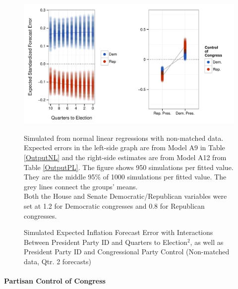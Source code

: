 \documentclass[a4paper]{article}\usepackage{graphicx, color}
\newenvironment{knitrout}{}{} %
\begin{document}
\begin{figure}[t]
    \caption{Simulated Expected Inflation Forecast Error with Interactions Between President Party ID and Quarters to Election$^{2}$, as well as President Party ID and Congressional Party Control (Non-matched data, Qtr. 2 forecasts)}
    \label{InterPlot}
    \begin{center}

\begin{knitrout}
\color{fgcolor}

{\centering \includegraphics[width=0.95\linewidth]{figure/InterPlot} 

}



\end{knitrout}


    \end{center}
    \begin{singlespace}
        {\scriptsize{Simulated from normal linear regressions with non-matched data. Expected errors in the left-side graph are from Model A9 in Table \ref{OutputNL} and the right-side estimates are from Model A12 from Table \ref{OutputPL}. The figure shows 950 simulations per fitted value. They are the middle 95\% of 1000 simulations per fitted value. The grey lines connect the groups' means.  \\ Both the House and Senate Democratic/Republican variables were set at 1.2 for Democratic congresses and 0.8 for Republican congresses.}}
    \end{singlespace}
\end{figure}

\paragraph{Partisan Control of Congress}
\end{document}
